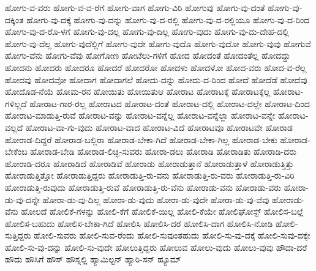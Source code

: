 {ಹೋಗು-ವ-ವರು
ಹೋಗು-ವ-ವ-ರೆಗೆ
ಹೋಗು-ವಾಗ
ಹೋಗು-ವಿರಿ
ಹೋಗುವು
ಹೋಗು-ವು-ದಂತೆ
ಹೋಗು-ವು-ದಕ್ಕಿಂತ
ಹೋಗು-ವು-ದಕ್ಕೆ
ಹೋಗು-ವು-ದನ್ನು
ಹೋಗು-ವು-ದ-ರಲ್ಲಿ
ಹೋಗು-ವು-ದ-ರಲ್ಲಿಯೂ
ಹೋಗು-ವು-ದ-ರಿಂದ
ಹೋಗು-ವು-ದ-ರೊ-ಳಗೆ
ಹೋಗು-ವು-ದಲ್ಲ
ಹೋಗು-ವು-ದಿಲ್ಲ
ಹೋಗು-ವುದು
ಹೋಗು-ವು-ದು-ದೇಹ-ದಲ್ಲಿ
ಹೋಗು-ವು-ದೆಲ್ಲ
ಹೋಗು-ವುದೆಲ್ಲಿಗೆ
ಹೋಗು-ವುದೇ
ಹೋಗು-ವುದೊ
ಹೋಗು-ವುದೋ
ಹೋಗು-ವುವು
ಹೋಗುವೆ
ಹೋಗು-ವೆನು
ಹೋಗು-ವೆವು
ಹೋಗೋಣ
ಹೋಟೆಲು-ಗಳಿಗೆ
ಹೋದ
ಹೋದಂತೆ
ಹೋದಂತೆಲ್ಲ
ಹೋದದ್ದು
ಹೋದನು
ಹೋದರು
ಹೋದರೂ
ಹೋದರೆ
ಹೋದರೋ
ಹೋದಳು
ಹೋದಳೋ
ಹೋದ-ವರು
ಹೋದ-ವ-ರೆಲ್ಲ
ಹೋದವು
ಹೋದವೋ
ಹೋದಾಗ
ಹೋದಾಗಲೆ
ಹೋದು-ದನ್ನು
ಹೋದು-ದ-ರಿಂದ
ಹೋದೆ
ಹೋದೆಡೆ
ಹೋದೆವು
ಹೋದೊಡ-ನೆಯೆ
ಹೋಮ-ರನ
ಹೋಯಿತು
ಹೋಯಿತುಆ
ಹೋರಾಟ
ಹೋರಾಟಕ್ಕೆ
ಹೋರಾಟಕ್ಕೆಲ್ಲ
ಹೋರಾಟ-ಗಳಿಲ್ಲದೆ
ಹೋರಾಟ-ಗಾರ-ರಲ್ಲ
ಹೋರಾಟದ
ಹೋರಾಟ-ದಂತೆ
ಹೋರಾಟ-ದಲ್ಲಿ
ಹೋರಾಟ-ದಲ್ಲೇ
ಹೋರಾಟ-ದಿಂದ
ಹೋರಾಟ-ಮಾಡುತ್ತಿ-ರುವೆ
ಹೋರಾಟ-ವನ್ನು
ಹೋರಾಟ-ವನ್ನೆಲ್ಲ
ಹೋರಾಟ-ವನ್ನೆಲ್ಲಾ
ಹೋರಾಟ-ವನ್ನೇ
ಹೋರಾಟ-ವಲ್ಲದೆ
ಹೋರಾಟ-ವಾ-ಗು-ವುದು
ಹೋರಾಟ-ವಾದ
ಹೋರಾಟ-ವಿದೆ
ಹೋರಾಟವೂ
ಹೋರಾಟವೇ
ಹೋರಾಡ
ಹೋರಾಡ-ದಿದ್ದರೆ
ಹೋರಾಡ-ಬಲ್ಲಿರಾ
ಹೋರಾಡ-ಬೇಕಾ-ಗಿದೆ
ಹೋರಾಡ-ಬೇಕಾ-ಗಿಲ್ಲ
ಹೋರಾಡ-ಬೇಕು
ಹೋರಾಡ-ಬೇಕೆಂಬ
ಹೋರಾಡ-ಬೇಡಿ
ಹೋರಾಡ-ಲಿಚ್ಛಿ-ಸುವರು
ಹೋರಾ-ಡಲು
ಹೋರಾಡಿ
ಹೋರಾಡಿತು
ಹೋರಾಡಿ-ದರು
ಹೋರಾಡಿ-ದರೂ
ಹೋರಾಡಿದೆ
ಹೋರಾಡಿವೆ
ಹೋರಾಡು
ಹೋರಾಡುತ್ತಾನೆ
ಹೋರಾಡುತ್ತಾಳೆ
ಹೋರಾಡುತ್ತಿತ್ತು
ಹೋರಾಡುತ್ತಿತ್ತೋ
ಹೋರಾಡುತ್ತಿದ್ದರು
ಹೋರಾಡುತ್ತಿ-ರು-ವನು
ಹೋರಾಡುತ್ತಿ-ರು-ವರು
ಹೋರಾಡುತ್ತಿ-ರು-ವಿರಿ
ಹೋರಾಡುತ್ತಿ-ರುವುದು
ಹೋರಾಡುತ್ತಿ-ರುವೆ
ಹೋರಾಡುತ್ತಿ-ರು-ವೆನು
ಹೋರಾಡು-ವನು
ಹೋರಾಡು-ವರು
ಹೋರಾ-ಡು-ವು-ದನ್ನೇ
ಹೋರಾ-ಡು-ವು-ದಿಲ್ಲ
ಹೋರಾ-ಡು-ವುದು
ಹೋರಾ-ಡು-ವುದೇ
ಹೋರಾ-ಡು-ವು-ವೆವು
ಹೋರಾಡು-ವೆನು
ಹೋಲದೆ
ಹೋಲಿಕೆ-ಗಳನ್ನು
ಹೋಲಿ-ಕೆಗೆ
ಹೋಲಿಕೆ-ಯಿಲ್ಲ
ಹೋಲಿ-ಕೆಯೇ
ಹೋಲಿಘೋಸ್ಟ್
ಹೋಲಿಸ-ಬಲ್ಲೆ
ಹೋಲಿಸ-ಬಹುದು
ಹೋಲಿಸ-ಬೇಕಾ-ಗಿದೆ
ಹೋಲಿಸಿ
ಹೋಲಿಸಿ-ದರೆ
ಹೋಲಿಸಿ-ದಾಗ
ಹೋಲಿಸಿ-ನೋಡಿ
ಹೋಲಿ-ಸುತ್ತಿದ್ದರು
ಹೋಲಿ-ಸುವರು
ಹೋಲಿ-ಸುವ-ರೆಂದು
ಹೋಲಿ-ಸುವುಂತಹುದು
ಹೋಲಿ-ಸು-ವು-ದಕ್ಕೆ
ಹೋಲಿ-ಸುವು-ದಕ್ಕೇ
ಹೋಲಿ-ಸು-ವು-ದನ್ನು
ಹೋಲಿ-ಸು-ವುದೇ
ಹೋಲುತ್ತಿದ್ದರು
ಹೋಲುವ
ಹೋಲು-ವುದು
ಹೋಲು-ವುವು
ಹೌದಾ-ದರೆ
ಹೌದು
ಹೌಸಿಗೆ
ಹೌಸ್
ಹೌಸ್ನಲ್ಲಿ
ಹ್ಯಾಮಿಲ್ಟನ್
ಹ್ಯಾರಿ-ಸನ್
ಹ್ಯೂಮ್
}
